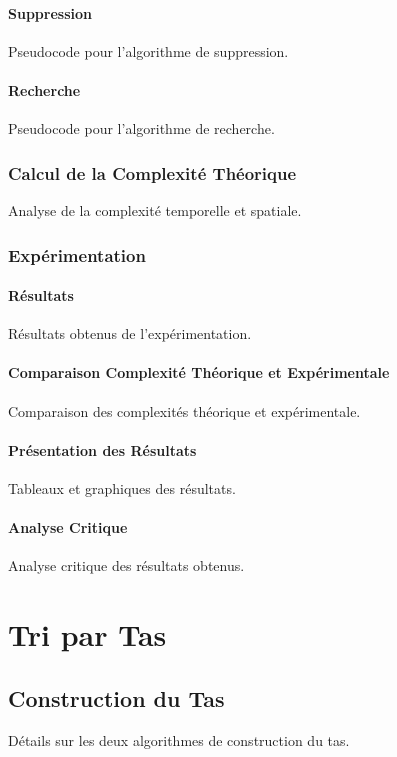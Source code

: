 \documentclass[a4paper, 12pt]{article}
\begin{document}
\paragraph{Suppression}
Pseudocode pour l'algorithme de suppression.

\paragraph{Recherche}
Pseudocode pour l'algorithme de recherche.

\subsubsection{Calcul de la Complexité Théorique}
Analyse de la complexité temporelle et spatiale.

\subsubsection{Expérimentation}
\paragraph{Résultats}
Résultats obtenus de l'expérimentation.

\paragraph{Comparaison Complexité Théorique et Expérimentale}
Comparaison des complexités théorique et expérimentale.

\paragraph{Présentation des Résultats}
Tableaux et graphiques des résultats.

\paragraph{Analyse Critique}
Analyse critique des résultats obtenus.

\section{Tri par Tas}
\subsection{Construction du Tas}
Détails sur les deux algorithmes de construction du tas.
\end{document}

